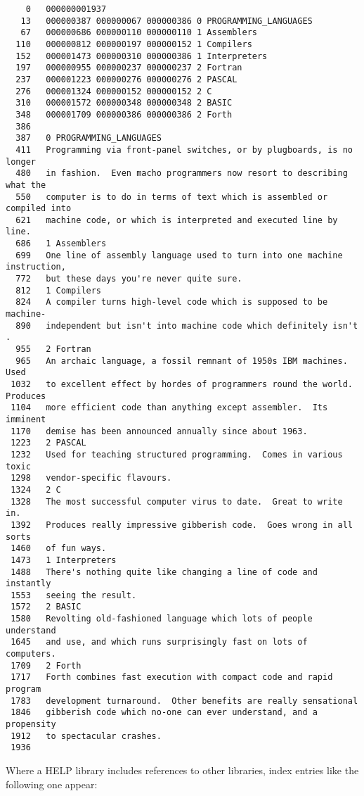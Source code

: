 \begin{small}
\begin{verbatim}
    0   000000001937
   13   000000387 000000067 000000386 0 PROGRAMMING_LANGUAGES
   67   000000686 000000110 000000110 1 Assemblers
  110   000000812 000000197 000000152 1 Compilers
  152   000001473 000000310 000000386 1 Interpreters
  197   000000955 000000237 000000237 2 Fortran
  237   000001223 000000276 000000276 2 PASCAL
  276   000001324 000000152 000000152 2 C
  310   000001572 000000348 000000348 2 BASIC
  348   000001709 000000386 000000386 2 Forth
  386   
  387   0 PROGRAMMING_LANGUAGES
  411   Programming via front-panel switches, or by plugboards, is no longer
  480   in fashion.  Even macho programmers now resort to describing what the
  550   computer is to do in terms of text which is assembled or compiled into
  621   machine code, or which is interpreted and executed line by line.
  686   1 Assemblers
  699   One line of assembly language used to turn into one machine instruction,
  772   but these days you're never quite sure.
  812   1 Compilers
  824   A compiler turns high-level code which is supposed to be machine-
  890   independent but isn't into machine code which definitely isn't .
  955   2 Fortran
  965   An archaic language, a fossil remnant of 1950s IBM machines.  Used
 1032   to excellent effect by hordes of programmers round the world.  Produces
 1104   more efficient code than anything except assembler.  Its imminent
 1170   demise has been announced annually since about 1963.
 1223   2 PASCAL
 1232   Used for teaching structured programming.  Comes in various toxic
 1298   vendor-specific flavours.
 1324   2 C
 1328   The most successful computer virus to date.  Great to write in.
 1392   Produces really impressive gibberish code.  Goes wrong in all sorts
 1460   of fun ways.
 1473   1 Interpreters
 1488   There's nothing quite like changing a line of code and instantly
 1553   seeing the result.
 1572   2 BASIC
 1580   Revolting old-fashioned language which lots of people understand
 1645   and use, and which runs surprisingly fast on lots of computers.
 1709   2 Forth
 1717   Forth combines fast execution with compact code and rapid program
 1783   development turnaround.  Other benefits are really sensational
 1846   gibberish code which no-one can ever understand, and a propensity
 1912   to spectacular crashes.
 1936    
\end{verbatim}
\end{small}

Where a HELP library includes references to other libraries, index
entries like the following one appear:


